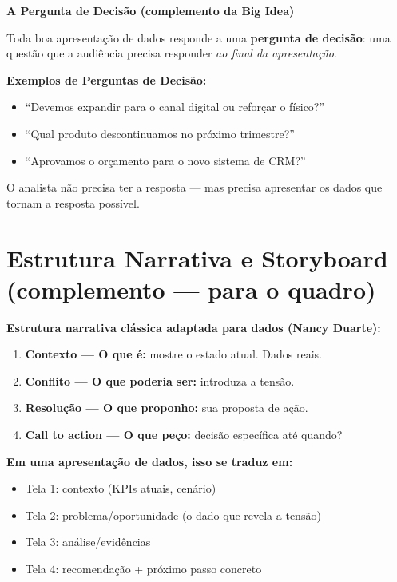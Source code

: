 \begin{BoardBox}
\textbf{A Pergunta de Decisão (complemento da Big Idea)}

Toda boa apresentação de dados responde a uma \textbf{pergunta de decisão}:
uma questão que a audiência precisa responder \emph{ao final da apresentação}.

\textbf{Exemplos de Perguntas de Decisão:}
\begin{itemize}
  \item ``Devemos expandir para o canal digital ou reforçar o físico?''
  \item ``Qual produto descontinuamos no próximo trimestre?''
  \item ``Aprovamos o orçamento para o novo sistema de CRM?''
\end{itemize}

O analista não precisa ter a resposta — mas precisa apresentar os dados que
tornam a resposta possível.
\end{BoardBox}

\section{Estrutura Narrativa e Storyboard (complemento — para o quadro)}

\begin{SolvedBox}
\textbf{Estrutura narrativa clássica adaptada para dados (Nancy Duarte):}

\begin{enumerate}
  \item \textbf{Contexto — O que é:} mostre o estado atual. Dados reais.
  \item \textbf{Conflito — O que poderia ser:} introduza a tensão.
  \item \textbf{Resolução — O que proponho:} sua proposta de ação.
  \item \textbf{Call to action — O que peço:} decisão específica até quando?
\end{enumerate}

\textbf{Em uma apresentação de dados, isso se traduz em:}
\begin{itemize}
  \item Tela 1: contexto (KPIs atuais, cenário)
  \item Tela 2: problema/oportunidade (o dado que revela a tensão)
  \item Tela 3: análise/evidências
  \item Tela 4: recomendação + próximo passo concreto
\end{itemize}
\end{SolvedBox}

